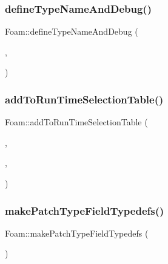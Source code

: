 \subsubsection{\texorpdfstring{define\+Type\+Name\+And\+Debug()}{defineTypeNameAndDebug()}\hspace{0.1cm}{\footnotesize\ttfamily [2/50]}}
{\footnotesize\ttfamily Foam\+::define\+Type\+Name\+And\+Debug (\begin{DoxyParamCaption}\item[{\hyperlink{classFoam_1_1adjointDiffusionNeutronics}{adjoint\+Diffusion\+Neutronics}}]{,  }\item[{0}]{ }\end{DoxyParamCaption})}

\mbox{\label{namespaceFoam_ae331cdd35edb3af76b0da34e70c87242}} 
\subsubsection{\texorpdfstring{add\+To\+Run\+Time\+Selection\+Table()}{addToRunTimeSelectionTable()}\hspace{0.1cm}{\footnotesize\ttfamily [1/6]}}
{\footnotesize\ttfamily Foam\+::add\+To\+Run\+Time\+Selection\+Table (\begin{DoxyParamCaption}\item[{\hyperlink{classFoam_1_1neutronics}{neutronics}}]{,  }\item[{\hyperlink{classFoam_1_1adjointDiffusionNeutronics}{adjoint\+Diffusion\+Neutronics}}]{,  }\item[{dictionary}]{ }\end{DoxyParamCaption})}

\mbox{\label{namespaceFoam_a160dec4c58ee86bed756b16d47d7d021}} 
\subsubsection{\texorpdfstring{make\+Patch\+Type\+Field\+Typedefs()}{makePatchTypeFieldTypedefs()}\hspace{0.1cm}{\footnotesize\ttfamily [1/3]}}
{\footnotesize\ttfamily Foam\+::make\+Patch\+Type\+Field\+Typedefs (\begin{DoxyParamCaption}\item[{albedo\+S\+P3}]{ }\end{DoxyParamCaption})}



